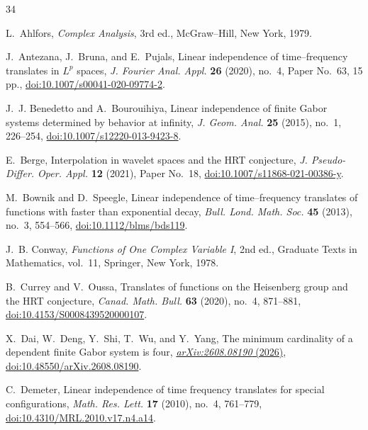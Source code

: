 \documentclass[reqno]{amsart}
\theoremstyle{remark}
\numberwithin{equation}{section}
\begin{document}
\begingroup
\footnotesize
\begin{thebibliography}{34}

L.~Ahlfors,
\emph{Complex Analysis}, 3rd ed.,
McGraw--Hill, New York, 1979.

J.~Antezana, J.~Bruna, and E.~Pujals,
Linear independence of time--frequency translates in \(L^p\) spaces,
\emph{J. Fourier Anal. Appl.} \textbf{26} (2020), no.~4,
Paper No.~63, 15 pp.,
\href{https://doi.org/10.1007/s00041-020-09774-2}
{doi:10.1007/s00041-020-09774-2}.

J.~J. Benedetto and A.~Bourouihiya,
Linear independence of finite Gabor systems determined by behavior at infinity,
\emph{J. Geom. Anal.} \textbf{25} (2015), no.~1, 226--254,
\href{https://doi.org/10.1007/s12220-013-9423-8}
{doi:10.1007/s12220-013-9423-8}.

E.~Berge,
Interpolation in wavelet spaces and the HRT conjecture,
\emph{J. Pseudo-Differ. Oper. Appl.} \textbf{12} (2021),
Paper No.~18,
\href{https://doi.org/10.1007/s11868-021-00386-y}
{doi:10.1007/s11868-021-00386-y}.

M.~Bownik and D.~Speegle,
Linear independence of time--frequency translates of functions with faster
than exponential decay,
\emph{Bull. Lond. Math. Soc.} \textbf{45} (2013), no.~3, 554--566,
\href{https://doi.org/10.1112/blms/bds119}{doi:10.1112/blms/bds119}.

J.~B. Conway,
\emph{Functions of One Complex Variable I}, 2nd ed.,
Graduate Texts in Mathematics, vol.~11,
Springer, New York, 1978.

B.~Currey and V.~Oussa,
Translates of functions on the Heisenberg group and the HRT conjecture,
\emph{Canad. Math. Bull.} \textbf{63} (2020), no.~4, 871--881,
\href{https://doi.org/10.4153/S0008439520000107}{doi:10.4153/S0008439520000107}.

X.~Dai, W.~Deng, Y.~Shi, T.~Wu, and Y.~Yang,
The minimum cardinality of a dependent finite Gabor system is four,
\href{https://arxiv.org/abs/2608.08190}{\emph{arXiv:2608.08190} (2026)},
\href{https://doi.org/10.48550/arXiv.2608.08190}
{doi:10.48550/arXiv.2608.08190}.

C.~Demeter,
Linear independence of time frequency translates for special configurations,
\emph{Math. Res. Lett.} \textbf{17} (2010), no.~4, 761--779,
\href{https://doi.org/10.4310/MRL.2010.v17.n4.a14}
{doi:10.4310/MRL.2010.v17.n4.a14}.


\end{thebibliography}
\end{document}
